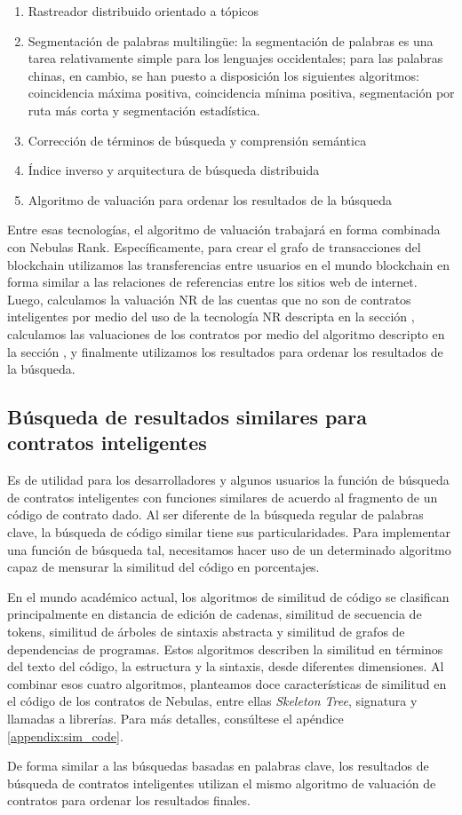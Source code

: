 \begin{enumerate}
	\item Rastreador distribuido orientado a tópicos
	\item Segmentación de palabras multilingüe: la segmentación de palabras es una tarea relativamente simple para los lenguajes occidentales; para las palabras chinas, en cambio, se han puesto a disposición los siguientes algoritmos: coincidencia máxima positiva, coincidencia mínima positiva, segmentación por ruta más corta y segmentación estadística.
	\item Corrección de términos de búsqueda y comprensión semántica
	\item Índice inverso y arquitectura de búsqueda distribuida
	\item Algoritmo de valuación para ordenar los resultados de la búsqueda

\end{enumerate}

Entre esas tecnologías, el algoritmo de valuación trabajará en forma combinada con Nebulas Rank. Específicamente, para crear el grafo de transacciones del blockchain utilizamos las transferencias entre usuarios en el mundo blockchain en forma similar a las relaciones de referencias entre los sitios web de internet. Luego, calculamos la valuación NR de las cuentas que no son de contratos inteligentes por medio del uso de la tecnología NR descripta en la sección , calculamos las valuaciones de los contratos por medio del algoritmo descripto en la sección , y finalmente utilizamos los resultados para ordenar los resultados de la búsqueda.

\subsection{Búsqueda de resultados similares para contratos inteligentes}

Es de utilidad para los desarrolladores y algunos usuarios la función de búsqueda de contratos inteligentes con funciones similares de acuerdo al fragmento de un código de contrato dado. Al ser diferente de la búsqueda regular de palabras clave, la búsqueda de código similar tiene sus particularidades. Para implementar una función de búsqueda tal, necesitamos hacer uso de un determinado algoritmo capaz de mensurar la similitud del código en porcentajes.

En el mundo académico actual, los algoritmos de similitud de código se clasifican principalmente en distancia de edición de cadenas, similitud de secuencia de tokens, similitud de árboles de sintaxis abstracta y similitud de grafos de dependencias de programas. Estos algoritmos describen la similitud en términos del texto del código, la estructura y la sintaxis, desde diferentes dimensiones. Al combinar esos cuatro algoritmos, planteamos doce características de similitud en el código de los contratos de Nebulas, entre ellas \textit{Skeleton Tree}, signatura y llamadas a librerías. Para más detalles, consúltese el apéndice \ref{appendix:sim_code}.

De forma similar a las búsquedas basadas en palabras clave, los resultados de búsqueda de contratos inteligentes utilizan el mismo algoritmo de valuación de contratos para ordenar los resultados finales.